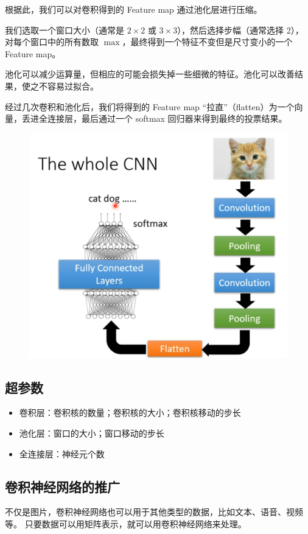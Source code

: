 根据此，我们可以对卷积得到的 Feature map 通过池化层进行压缩。

我们选取一个窗口大小（通常是 $2\times2$ 或 $3\times3$），然后选择步幅（通常选择 2），
对每个窗口中的所有数取 $\max$，最终得到一个特征不变但是尺寸变小的一个 Feature map。

池化可以减少运算量，但相应的可能会损失掉一些细微的特征。池化可以改善结果，使之不容易过拟合。

经过几次卷积和池化后，我们将得到的 Feature map “拉直”（flatten）为一个向量，丢进全连接层，最后通过一个 softmax 回归器来得到最终的投票结果。

\begin{figure}[htbp]
    \centering
    \includegraphics[scale = 0.25]{CNN.png}
\end{figure}

\subsection{超参数}
\begin{itemize}
    \item 卷积层：卷积核的数量；卷积核的大小；卷积核移动的步长
    \item 池化层：窗口的大小；窗口移动的步长
    \item 全连接层：神经元个数
\end{itemize}

\subsection{卷积神经网络的推广}
不仅是图片，卷积神经网络也可以用于其他类型的数据，比如文本、语音、视频等。
只要数据可以用矩阵表示，就可以用卷积神经网络来处理。